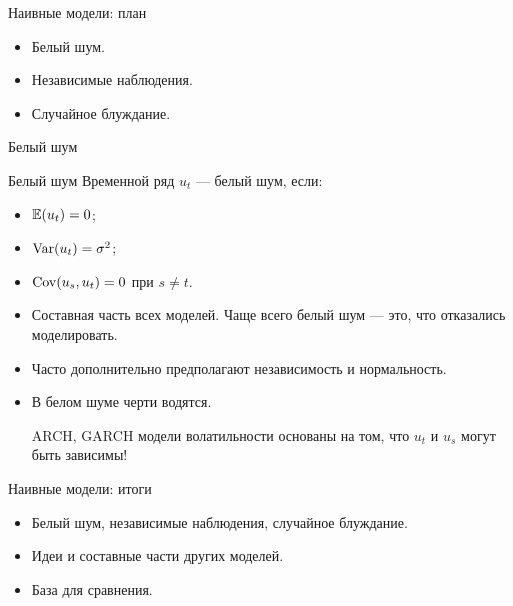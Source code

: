 
\begin{frame} %


\end{frame}



\begin{frame}{Наивные модели: план}
  \begin{itemize}[<+->]
    \item Белый шум. 
    \item Независимые наблюдения.
    \item Случайное блуждание.
  \end{itemize}

\end{frame}

\begin{frame}{Белый шум}

\begin{block}{Белый шум}
Временной ряд $u_t$ — белый шум, если:
\begin{itemize}
  \item $\mathbb{E}(u_t) = 0$;
  \item $\operatorname{Var}(u_t) = \sigma^2$;
  \item $\operatorname{Cov}(u_s, u_t) = 0$ при $s\neq t$.
\end{itemize}
\end{block}

\pause
\begin{itemize}[<+->]
  \item Составная часть всех моделей. Чаще всего белый шум — это, что отказались моделировать. 
  \item Часто дополнительно предполагают \alert{независимость} и \alert{нормальность}. 
  \item В белом шуме \alert{черти водятся}.
  
  ARCH, GARCH модели волатильности основаны на том, что $u_t$ и $u_s$ могут быть зависимы!
\end{itemize}

\end{frame}


\begin{frame}{Наивные модели: итоги}

  \begin{itemize}[<+->]
    \item Белый шум, независимые наблюдения, случайное блуждание.
    \item Идеи и составные части других моделей.
    \item База для сравнения.
  \end{itemize}
\end{frame}

